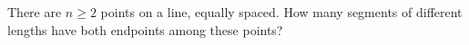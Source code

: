 There are $n\ge2$ points on a line, equally spaced. How many segments of different lengths have both endpoints among these points?
